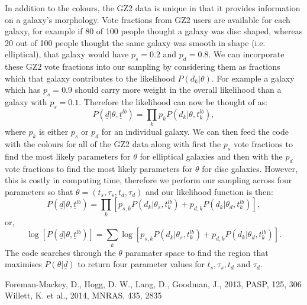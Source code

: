 \documentclass{article}[11pt]
\begin{document}
In addition to the colours, the GZ2 data is unique in that it provides information on a galaxy's morphology. Vote fractions from GZ2 users are available for each galaxy, for example if 80 of 100 people thought a galaxy was disc shaped, whereas 20 out of 100 people thought the same galaxy was smooth in shape (i.e. elliptical), that galaxy would have $p_{s} = 0.2$ and $p_{d} = 0.8$. We can incorporate these GZ2 vote fractions  into our sampling by considering them as fractions which that galaxy contributes to the likelihood $P(d_{k}|\theta)$. For example a galaxy which has $p_{s} = 0.9$ should carry more weight in the overall likelihood than a galaxy with $p_{s} = 0.1$. Therefore the likelihood can now be thought of as:
\begin{equation*}
P(\underline{d}|\theta, \underline{t}^{lb}) = \prod_{k} p_{k} P(d_{k}|\theta, t_{k}^{lb}),
\end{equation*}
where $p_{k}$ is either $p_{s}$ or $p_{d}$ for an individual galaxy. We can then feed the code with the colours for all of the GZ2 data along with first the $p_{s}$ vote fractions to find the most likely parameters for $\theta$ for elliptical galaxies and then with the $p_{d}$ vote fractions to find the most likely parameters for $\theta$ for disc galaxies. However, this is costly in computing time, therefore we perform our sampling across four parameters so that $\theta = (t_{s}, \tau_{s}, t_{d}, \tau_{d})$ and our likelihood function is then:
\begin{equation*}
P(\underline{d}|\theta, \underline{t}^{lb}) = \prod_{k} \left [p_{s, k} P(d_{k}|\theta_{s}, t_{k}^{lb}) + p_{d, k} P(d_{k}|\theta_{d}, t_{k}^{lb}) \right],
\end{equation*}
or,
\begin{equation*}
\log \left[ P(\underline{d}|\theta, \underline{t}^{lb}) \right] = \sum_{k} \log \left [p_{s, k} P(d_{k}|\theta_{s}, t_{k}^{lb}) + p_{d, k} P(d_{k}|\theta_{d}, t_{k}^{lb}) \right]. 
\end{equation*}
The code searches through the $\theta$ paramater space to find the region that maximises $P(\theta|\underline{d})$ to return four parameter values for $t_{s}, \tau_{s}, t_{d}$ and $\tau_{d}$.


\begin{thebibliography}{}
 Foreman-Mackey, D., Hogg, D. W., Lang, D., Goodman, J., 2013, PASP, 125, 306
 Willett, K. et al., 2014, MNRAS, 435, 2835
\end{thebibliography}{}
\end{document}
